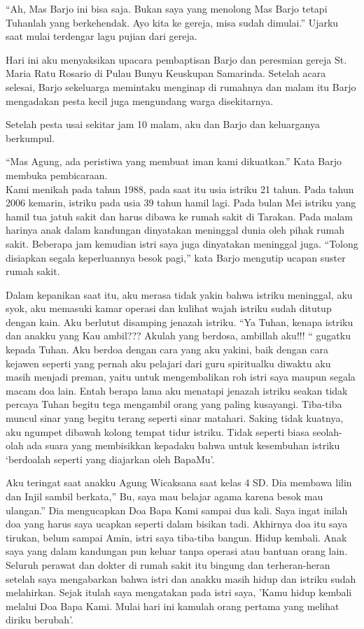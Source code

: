``Ah, Mas Barjo ini bisa saja. Bukan saya yang menolong Mas Barjo tetapi Tuhanlah yang berkehendak. Ayo kita ke gereja, misa sudah dimulai.'' Ujarku saat mulai  terdengar lagu pujian dari gereja.

Hari ini aku menyaksikan upacara pembaptisan Barjo dan peresmian gereja St. Maria Ratu Rosario di Pulau Bunyu Keuskupan Samarinda. Setelah acara selesai, Barjo sekeluarga memintaku menginap di rumahnya dan malam itu Barjo mengadakan pesta kecil juga mengundang warga disekitarnya. 

Setelah pesta usai sekitar jam 10 malam, aku dan Barjo dan keluarganya berkumpul. 

``Mas Agung, ada peristiwa yang membuat iman kami dikuatkan.'' Kata Barjo membuka pembicaraan.\\
Kami menikah pada tahun 1988, pada saat itu usia istriku 21 tahun. Pada tahun 2006 kemarin, istriku pada usia 39 tahun hamil lagi. Pada bulan Mei istriku  yang hamil tua jatuh sakit dan harus dibawa ke rumah sakit di Tarakan. Pada malam harinya anak dalam kandungan dinyatakan meninggal dunia oleh pihak rumah sakit. Beberapa jam kemudian istri saya juga dinyatakan meninggal juga. ``Tolong disiapkan segala keperluannya besok pagi,'' kata Barjo mengutip ucapan suster rumah sakit.

Dalam kepanikan saat itu, aku merasa tidak yakin bahwa istriku meninggal, aku syok, aku memasuki kamar operasi dan kulihat wajah istriku sudah ditutup dengan kain. Aku berlutut disamping jenazah istriku. ``Ya Tuhan, kenapa istriku dan anakku yang Kau ambil??? Akulah yang berdosa, ambillah aku!!! `` gugatku kepada Tuhan. Aku berdoa dengan cara yang aku yakini, baik dengan cara kejawen seperti yang pernah aku pelajari dari guru spiritualku diwaktu aku masih menjadi preman, yaitu untuk mengembalikan roh istri saya maupun segala macam doa lain. Entah berapa lama aku menatapi jenazah istriku seakan tidak percaya Tuhan begitu tega mengambil orang yang paling kusayangi. Tiba-tiba muncul sinar yang begitu terang seperti sinar matahari. Saking tidak kuatnya, aku ngumpet dibawah kolong tempat tidur istriku. Tidak seperti biasa seolah-olah ada suara yang membisikkan kepadaku bahwa untuk kesembuhan istriku `berdoalah seperti yang diajarkan oleh BapaMu'.  

Aku teringat saat anakku Agung Wicaksana saat kelas 4 SD. Dia membawa lilin dan Injil sambil berkata,'' Bu, saya mau belajar agama karena besok mau ulangan.'' Dia mengucapkan Doa Bapa Kami sampai dua kali. Saya ingat inilah doa yang harus saya ucapkan seperti dalam bisikan tadi. Akhirnya doa itu saya tirukan, belum sampai Amin, istri saya tiba-tiba bangun. Hidup kembali. Anak saya yang dalam kandungan pun keluar tanpa operasi atau bantuan orang lain. Seluruh perawat  dan dokter  di rumah sakit itu bingung dan terheran-heran setelah saya mengabarkan bahwa istri dan anakku masih hidup dan istriku sudah melahirkan. Sejak itulah saya mengatakan pada istri saya, 'Kamu hidup kembali melalui Doa Bapa Kami. Mulai hari ini kamulah orang pertama yang melihat diriku berubah'.

\vspace{0.5cm}


